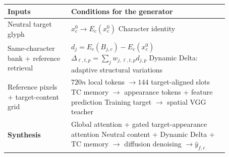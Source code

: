\begingroup\small
\setlength{\tabcolsep}{6pt}
\begin{tabular}{p{0.25\linewidth}p{0.62\linewidth}}
\toprule
\textbf{Inputs} & \textbf{Conditions for the generator}\\
\midrule
Neutral target glyph &
$x_c^0 \longrightarrow E_c(x_c^0)$ \quad Character identity\\[5pt]
Same-character bank \newline + reference retrieval &
$d_j=E_c(B_{j,c})-E_c(x_c^0)$\newline
$\Delta_{\ell,t,p}=\sum_j w_{j,\ell,t,p}d_{j,p}$\newline
Dynamic Delta: adaptive structural variations\\[6pt]
Reference pixels \newline + target-content grid &
$720n$ local tokens $\longrightarrow 144$ target-aligned slots\newline
TC memory $\longrightarrow$ appearance tokens + feature prediction\newline
Training target $\longrightarrow$ spatial VGG teacher\\[6pt]
\midrule
\textbf{Synthesis} &
Global attention + gated target-appearance attention\newline
Neutral content + Dynamic Delta + TC memory\newline
$\longrightarrow$ diffusion denoising $\longrightarrow \hat y_{f,c}$\\[5pt]
\bottomrule
\end{tabular}
\endgroup
